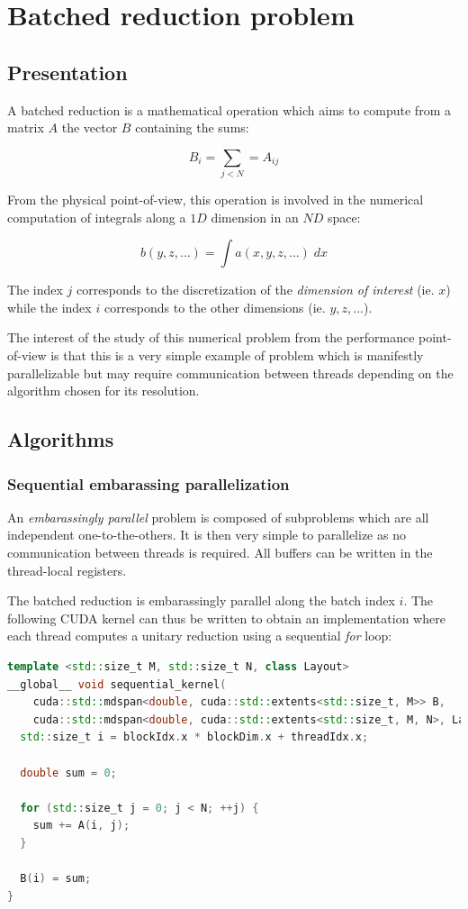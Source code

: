 \documentclass{article}
\begin{document}
\section{Batched reduction problem}

\subsection{Presentation}

A batched reduction is a mathematical operation which aims to compute from a matrix $A$ the vector $B$ containing the sums:

\[
B_i = \sum_{j<N} = A_{ij}
\]

From the physical point-of-view, this operation is involved in the numerical computation of integrals along a $1D$ dimension in an $ND$ space:

\[
b(y, z, ...) = \int a(x, y, z, ...)\; dx
\]

The index $j$ corresponds to the discretization of the \textit{dimension of interest} (ie. $x$) while the index $i$ corresponds to the other dimensions (ie. $y, z, ...$).

The interest of the study of this numerical problem from the performance point-of-view is that this is a very simple example of problem which is manifestly parallelizable but may require communication between threads depending on the algorithm chosen for its resolution.

\subsection{Algorithms}

\subsubsection{Sequential embarassing parallelization}

An \textit{embarassingly parallel} problem is composed of subproblems which are all independent one-to-the-others. It is then very simple to parallelize as no communication between threads is required. All buffers can be written in the thread-local registers.

The batched reduction is embarassingly parallel along the batch index $i$. The following CUDA kernel can thus be written to obtain an implementation where each thread computes a unitary reduction using a sequential \textit{for} loop:

\begin{lstlisting}[language=C++]
template <std::size_t M, std::size_t N, class Layout>
__global__ void sequential_kernel(
    cuda::std::mdspan<double, cuda::std::extents<std::size_t, M>> B,
    cuda::std::mdspan<double, cuda::std::extents<std::size_t, M, N>, Layout> A) {
  std::size_t i = blockIdx.x * blockDim.x + threadIdx.x;

  double sum = 0;

  for (std::size_t j = 0; j < N; ++j) {
    sum += A(i, j);
  }

  B(i) = sum;
}
\end{lstlisting}
\end{document}
